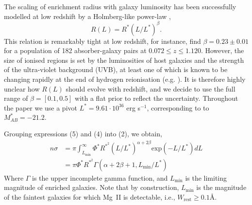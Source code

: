 \documentclass[useAMS,usenatbib]{mn2e}
\newcommand{\magtwo}{Mg~{\small II} }
\begin{document}
The scaling of enrichment radius with galaxy luminosity has been successfully modelled at low redshift by a Holmberg-like power-law \citep{Bergeron91},
\begin{equation} 
R(L) = R^* (L/L^*)^\beta.
\end{equation}
This relation is remarkably tight at low redshift, for instance, \citet{Nielsen13} find $\beta = 0.23 \pm 0.01$ for a population of 182 absorber-galaxy pairs at $0.072\leq z\leq 1.120$. However, the size of ionised regions is set by the luminosities of host galaxies and the strength of the ultra-violet background (UVB), at least one of which is known to be changing rapidly at the end of hydrogen reionisation (e.g. \citealt{Stark10,Forero12}). It is therefore highly unclear how $R(L)$ should evolve with redshift, and we decide to use the full range of $\beta=[0.1,0.5]$ with a flat prior to reflect the uncertainty. Throughout the paper we use a pivot $L^* = 9.61 \cdot 10^{36}$ erg s$^{-1}$, corresponding to to $M^*_{AB} = -21.2$.


Grouping expressions (5) and (4) into (2), we obtain,
\begin{equation} 
\begin{split}
n \sigma &= \pi \int_{L_\text{min}}^\infty \Phi^* R^{*^2} (L/L^*)^{\alpha+2\beta} \text{exp} (-L/L^*)dL  \\
&= \pi \Phi^* R^{*^2} \Gamma(\alpha+2\beta+1 , L_\text{min}/L^*) 
\end{split}
\end{equation}
Where $\Gamma$ is the upper incomplete gamma function, and $L_\text{min}$ is the limiting magnitude of enriched galaxies. Note that by construction, $L_\text{min}$ is the magnitude of the faintest galaxies for which \magtwo is detectable, i.e., $W_\text{rest}\geq 0.1$\AA.  
\end{document}
